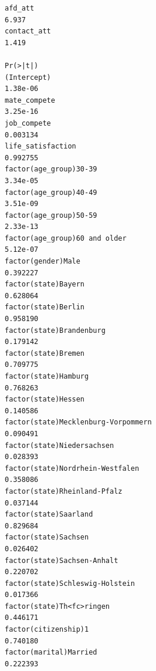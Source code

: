 \documentclass[
]{article}
\begin{document}
\begin{table}
\begin{minipage}[t]{\linewidth}
{\begin{verbatim}
afd_att                                                                             6.937
contact_att                                                                         1.419
                                                                                  Pr(>|t|)
(Intercept)                                                                       1.38e-06
mate_compete                                                                      3.25e-16
job_compete                                                                       0.003134
life_satisfaction                                                                 0.992755
factor(age_group)30-39                                                            3.34e-05
factor(age_group)40-49                                                            3.51e-09
factor(age_group)50-59                                                            2.33e-13
factor(age_group)60 and older                                                     5.12e-07
factor(gender)Male                                                                0.392227
factor(state)Bayern                                                               0.628064
factor(state)Berlin                                                               0.958190
factor(state)Brandenburg                                                          0.179142
factor(state)Bremen                                                               0.709775
factor(state)Hamburg                                                              0.768263
factor(state)Hessen                                                               0.140586
factor(state)Mecklenburg-Vorpommern                                               0.090491
factor(state)Niedersachsen                                                        0.028393
factor(state)Nordrhein-Westfalen                                                  0.358086
factor(state)Rheinland-Pfalz                                                      0.037144
factor(state)Saarland                                                             0.829684
factor(state)Sachsen                                                              0.026402
factor(state)Sachsen-Anhalt                                                       0.220702
factor(state)Schleswig-Holstein                                                   0.017366
factor(state)Th<fc>ringen                                                         0.446171
factor(citizenship)1                                                              0.740180
factor(marital)Married                                                            0.222393

\end{verbatim}}
\end{minipage}
\end{table}
\end{document}

